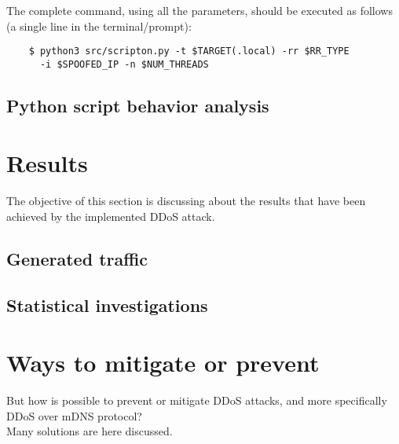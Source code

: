 \documentclass[fleqn, 10pt]{SelfArx} %
\begin{document}
The complete command, using all the parameters, should be executed as follows (a single line in the terminal/prompt):

\begin{scriptsize}
	\begin{verbatim}
	$ python3 src/scripton.py -t $TARGET(.local) -rr $RR_TYPE
	  -i $SPOOFED_IP -n $NUM_THREADS 
	\end{verbatim}
\end{scriptsize}

\subsection{Python script behavior analysis}


\section{Results}
The objective of this section is discussing about the results that have been achieved by the implemented DDoS attack.

\subsection{Generated traffic}

\subsection{Statistical investigations}



\section{Ways to mitigate or prevent}
But how is possible to prevent or mitigate DDoS attacks, and more specifically DDoS over mDNS protocol? \\
Many solutions are here discussed.




\nocite{*}

\end{document}
